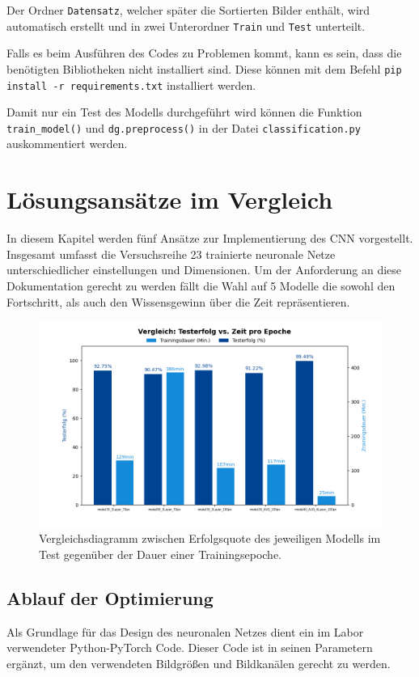 \documentclass[journal,twoside,web]{ieeecolor}
\begin{document}
Der Ordner \texttt{Datensatz}, welcher später die Sortierten Bilder enthält, wird automatisch erstellt und in zwei Unterordner \texttt{Train} und \texttt{Test} unterteilt.

Falls es beim Ausführen des Codes zu Problemen kommt, kann es sein, dass die benötigten Bibliotheken nicht installiert sind. Diese können mit dem Befehl \texttt{pip install -r requirements.txt} installiert werden.

Damit nur ein Test des Modells durchgeführt wird können die Funktion \texttt{train\_model()} und \texttt{dg.preprocess()} in der Datei \texttt{classification.py} auskommentiert werden.


\section{Lösungsansätze im Vergleich}
In diesem Kapitel werden fünf Ansätze zur Implementierung des CNN vorgestellt. Insgesamt umfasst die Versuchsreihe 23 trainierte neuronale Netze unterschiedlicher einstellungen und Dimensionen.
Um der Anforderung an diese Dokumentation gerecht zu werden fällt die Wahl auf 5 Modelle die sowohl den Fortschritt, als auch den Wissensgewinn über die Zeit repräsentieren.

\begin{figure}[H]
    \centerline{\includegraphics[width=\columnwidth]{Erfolg_Dauer.png}}
    \caption{Vergleichsdiagramm zwischen Erfolgsquote des jeweiligen Modells im Test gegenüber der Dauer einer Trainingsepoche.}
    \label{fig:compareGraph}
\end{figure}

\subsection{Ablauf der Optimierung}
\label{sec:optimization}
Als Grundlage für das Design des neuronalen Netzes dient ein im Labor verwendeter Python-PyTorch Code. Dieser Code ist in seinen Parametern ergänzt, um den verwendeten Bildgrößen und Bildkanälen gerecht zu werden. 
\end{document}

